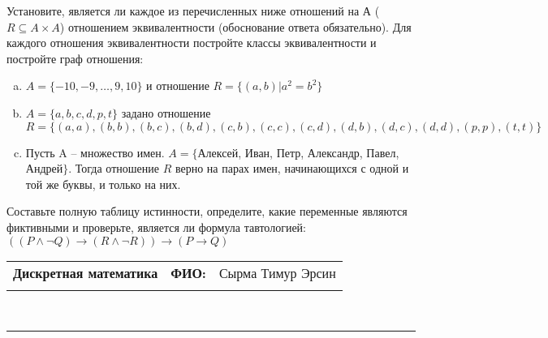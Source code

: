 \documentclass[10pt]{exam}
\newcommand{\class}{Дискретная математика}
\newcommand{\examdate}{}
\begin{document}
\begin{questions}
\question
Установите, является ли каждое из перечисленных ниже отношений на А ($R \subseteq A \times A$) отношением эквивалентности (обоснование ответа обязательно). Для каждого отношения эквивалентности постройте классы 
эквивалентности и постройте граф отношения:
\begin{enumerate} [a)]\setcounter{enumi}{0}
\item $A = \{-10, -9, … , 9, 10\}$ и отношение $R = \{(a,b)|a^{2} = b^{2}\}$
\item $A = \{a, b, c, d, p, t\}$ задано отношение $R = \{(a, a), (b, b), (b, c), (b, d), (c, b), (c, c), (c, d), (d, b), (d, c), (d, d), (p,p), (t,t)\}$
\item Пусть A – множество имен. $A = \{ $Алексей, Иван, Петр, Александр, Павел, Андрей$ \}$. Тогда отношение $R$ верно на парах имен, начинающихся с одной и той же буквы, и только на них.
\end{enumerate}\question Составьте полную таблицу истинности, определите, какие переменные являются фиктивными и проверьте, является ли формула тавтологией:
$(( P \land \neg Q) \rightarrow (R \land \neg R)) \rightarrow (P \rightarrow Q)$

\end{questions}
\newpage
\begin{flushright}
\begin{tabular}{p{2.8in} r l}
\textbf{\class} & \textbf{ФИО:} &Сырма Тимур Эрсин
\\

\textbf{\examdate} &&\\
\end{tabular}\\
\end{flushright}
\rule[1ex]{\textwidth}{.1pt}
\end{document}

